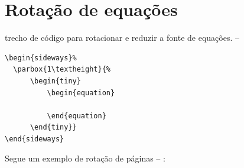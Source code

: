 \section{Rotação de equações}

trecho de código para rotacionar e reduzir a fonte de equações. -- \showfont

\begin{verbatim}
\begin{sideways}%
  \parbox{1\textheight}{%
      \begin{tiny}
          \begin{equation}

          \end{equation}
      \end{tiny}}
\end{sideways}
\end{verbatim}

Segue um exemplo de rotação de páginas -- \showfont: \newpage

